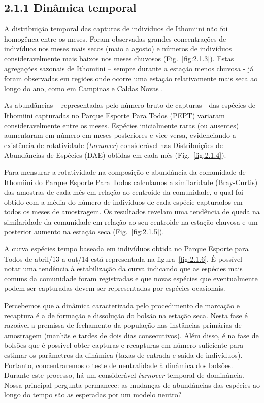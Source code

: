 \subsection{2.1.1 Dinâmica temporal} %
\label{sec:din-temp-borb}
A distribuição temporal das capturas de indivíduos de Ithomiini não
foi homogênea entre os meses. Foram observadas grandes concentrações
de indivíduos nos meses mais secos (maio a agosto) e números de
indivíduos consideravelmente mais baixos nos meses chuvosos
(Fig.~\ref{fig:2.1.3}). Estas agregações sazonais de Ithomiini –
sempre durante a estação menos chuvosa - já foram observadas em
regiões onde ocorre uma estação relativamente mais seca ao longo do
ano, como em Campinas \cite{brown2002} e Caldas Novas
\cite{Pinheiro_2008}.

As abundâncias – representadas pelo número bruto de capturas - das
espécies de Ithomiini capturadas no Parque Esporte Para Todos (PEPT)
variaram consideravelmente entre os meses. Espécies inicialmente raras
(ou ausentes) aumentaram em número em meses posteriores e vice-versa,
evidenciando a existência de rotatividade (\emph{turnover}) considerável nas
Distribuições de Abundâncias de Espécies (DAE) obtidas em cada mês
(Fig.~\ref{fig:2.1.4}).

Para mensurar a rotatividade na composição e
abundância da comunidade de Ithomiini do Parque Esporte Para Todos
calculamos a similaridade (Bray-Curtis) das amostras de cada mês em
relação ao centroide da comunidade, o qual foi obtido com a
média do número de indivíduos de cada espécie capturados em todos os
meses de amostragem. Os resultados revelam uma tendência de queda na
similaridade da comunidade em relação ao seu centroide na estação
chuvosa e um posterior aumento na estação seca (Fig.~\ref{fig:2.1.5}).

A curva espécies tempo baseada em indivíduos obtida no Parque Esporte
para Todos de abril/13 a out/14 está representada na
figura~\ref{fig:2.1.6}. É possível notar uma tendência à estabilização
da curva indicando que as espécies mais comuns da comunidade foram
registradas e que novas espécies que eventualmente podem ser
capturadas devem ser representadas por espécies ocasionais.

Percebemos que a dinâmica caracterizada pelo procedimento de marcação e recaptura
é a de formação e dissolução do bolsão na estação seca. 
Nesta fase é razoável a premissa de fechamento da população nas instâncias primárias
de amostragem (manhãs e tardes de dois dias consecutivos). Além disso, é na fase de bolsões
que é possível obter capturas e recapturas em número suficiente para estimar os parâmetros
da dinâmica (taxas de entrada e saída de indivíduos). Portanto, concentraremos 
o teste de neutralidade à dinâmica dos bolsões. 
Durante este processo, há um considerável \emph{turnover} temporal de dominância.
Nossa principal pergunta permanece: as mudanças de abundâncias das espécies ao longo
do tempo são as esperadas por um modelo neutro?

